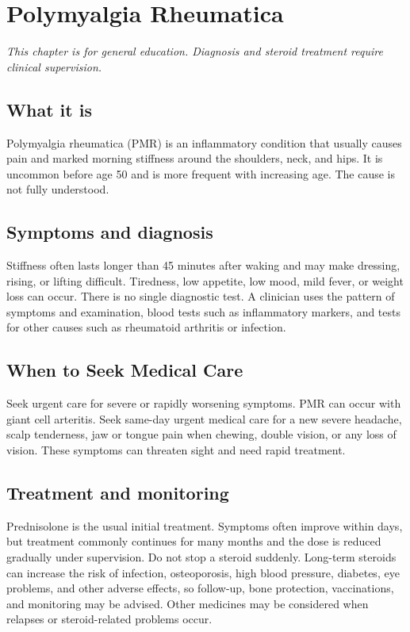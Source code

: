 \chapter{Polymyalgia Rheumatica}

\medskip
\noindent\textit{This chapter is for general education. Diagnosis and steroid treatment require clinical supervision.}

\section*{What it is}
Polymyalgia rheumatica (PMR) is an inflammatory condition that usually causes pain and marked morning stiffness around the shoulders, neck, and hips. It is uncommon before age 50 and is more frequent with increasing age. The cause is not fully understood.

\section*{Symptoms and diagnosis}
Stiffness often lasts longer than 45 minutes after waking and may make dressing, rising, or lifting difficult. Tiredness, low appetite, low mood, mild fever, or weight loss can occur. There is no single diagnostic test. A clinician uses the pattern of symptoms and examination, blood tests such as inflammatory markers, and tests for other causes such as rheumatoid arthritis or infection.

\section*{When to Seek Medical Care}
Seek urgent care for severe or rapidly worsening symptoms. PMR can occur with giant cell arteritis. Seek same-day urgent medical care for a new severe headache, scalp tenderness, jaw or tongue pain when chewing, double vision, or any loss of vision. These symptoms can threaten sight and need rapid treatment.

\section*{Treatment and monitoring}
Prednisolone is the usual initial treatment. Symptoms often improve within days, but treatment commonly continues for many months and the dose is reduced gradually under supervision. Do not stop a steroid suddenly. Long-term steroids can increase the risk of infection, osteoporosis, high blood pressure, diabetes, eye problems, and other adverse effects, so follow-up, bone protection, vaccinations, and monitoring may be advised. Other medicines may be considered when relapses or steroid-related problems occur.

